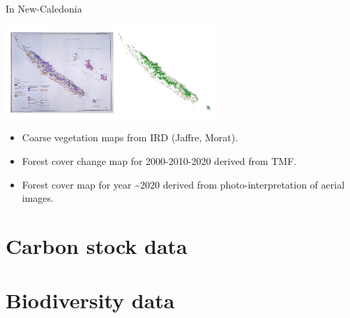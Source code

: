 \documentclass[10pt,table,dvipsnames,compress]{beamer}
\begin{document}
\begin{frame}[label={sec:org682ad8c}]{In New-Caledonia}
\begin{center}
\includegraphics[width=8cm]{figs/fcc/fcc_nc.png}
\end{center}

\begin{itemize}
\item Coarse vegetation maps from IRD (Jaffre, Morat).
\item Forest cover change map for 2000-2010-2020 derived from TMF.
\item Forest cover map for year \textasciitilde{}2020 derived from photo-interpretation of aerial images.
\end{itemize}
\end{frame}

\section{Carbon stock data}
\label{sec:org9169594}

\section{Biodiversity data}
\label{sec:orgd95464d}

\end{document}
